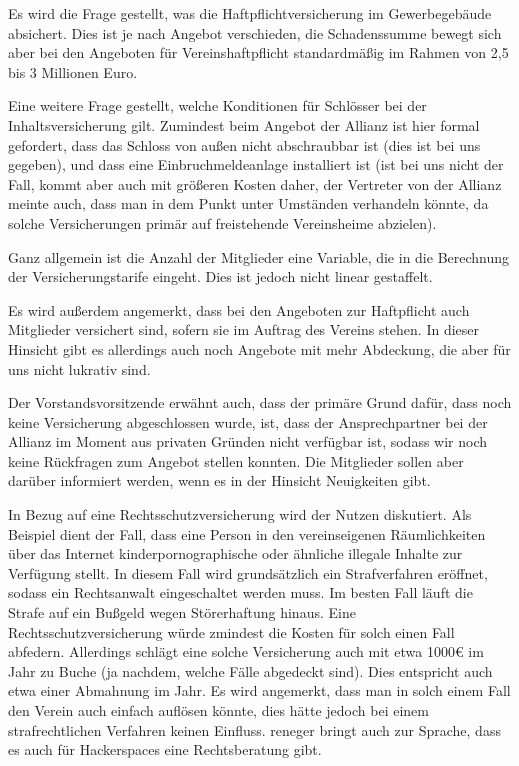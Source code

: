\documentclass[a4paper,12pt]{scrartcl}
\begin{document}
Es wird die Frage gestellt, was die Haftpflichtversicherung im Gewerbegebäude
absichert. Dies ist je nach Angebot verschieden, die Schadenssumme bewegt sich
aber bei den Angeboten für Vereinshaftpflicht standardmäßig im Rahmen von 2{,}5
bis 3 Millionen Euro.

Eine weitere Frage gestellt, welche Konditionen für Schlösser bei der
Inhaltsversicherung gilt. Zumindest beim Angebot der Allianz ist hier formal
gefordert, dass das Schloss von außen nicht abschraubbar ist (dies ist bei uns
gegeben), und dass eine Einbruchmeldeanlage installiert ist (ist bei uns nicht
der Fall, kommt aber auch mit größeren Kosten daher, der Vertreter von der
Allianz meinte auch, dass man in dem Punkt unter Umständen verhandeln könnte, da
solche Versicherungen primär auf freistehende Vereinsheime abzielen).

Ganz allgemein ist die Anzahl der Mitglieder eine Variable, die in die
Berechnung der Versicherungstarife eingeht. Dies ist jedoch nicht linear
gestaffelt.

Es wird außerdem angemerkt, dass bei den Angeboten zur Haftpflicht auch
Mitglieder versichert sind, sofern sie im Auftrag des Vereins stehen. In dieser
Hinsicht gibt es allerdings auch noch Angebote mit mehr Abdeckung, die aber für
uns nicht lukrativ sind.

Der Vorstandsvorsitzende erwähnt auch, dass der primäre Grund dafür, dass noch
keine Versicherung abgeschlossen wurde, ist, dass der Ansprechpartner bei der
Allianz im Moment aus privaten Gründen nicht verfügbar ist, sodass wir noch
keine Rückfragen zum Angebot stellen konnten. Die Mitglieder sollen aber darüber
informiert werden, wenn es in der Hinsicht Neuigkeiten gibt.

In Bezug auf eine Rechtsschutzversicherung wird der Nutzen diskutiert. Als
Beispiel dient der Fall, dass eine Person in den vereinseigenen Räumlichkeiten
über das Internet kinderpornographische oder ähnliche illegale Inhalte zur
Verfügung stellt. In diesem Fall wird grundsätzlich ein Strafverfahren eröffnet,
sodass ein Rechtsanwalt eingeschaltet werden muss. Im besten Fall läuft die
Strafe auf ein Bußgeld wegen Störerhaftung hinaus. Eine Rechtsschutzversicherung
würde zmindest die Kosten für solch einen Fall abfedern. Allerdings schlägt eine
solche Versicherung auch mit etwa 1000€ im Jahr zu Buche (ja nachdem, welche
Fälle abgedeckt sind). Dies entspricht auch etwa einer Abmahnung im Jahr. Es
wird angemerkt, dass man in solch einem Fall den Verein auch einfach auflösen
könnte, dies hätte jedoch bei einem strafrechtlichen Verfahren keinen Einfluss.
reneger bringt auch zur Sprache, dass es auch für Hackerspaces eine
Rechtsberatung gibt.
\end{document}
